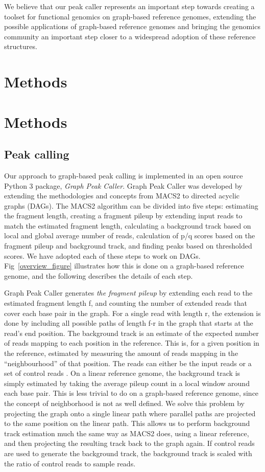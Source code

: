 \documentclass[10pt,letterpaper]{article}
\begin{document}
We believe that our peak caller represents an important step towards creating a toolset for functional genomics on graph-based reference genomes, extending the possible applications of graph-based reference genomes and bringing the genomics community an important step closer to a widespread adoption of these reference structures.

\section*{Methods}
\section*{Methods}
\subsection*{Peak calling}
Our approach to graph-based peak calling is implemented in an open source Python 3 package, \emph{Graph Peak Caller}. Graph Peak Caller was developed by extending the methodologies and concepts from MACS2 to directed acyclic graphs (DAGs). The MACS2 algorithm can be divided into five steps: estimating the fragment length, creating a fragment pileup by extending input reads to match the estimated fragment length, calculating a background track based on local and global average number of reads, calculation of p/q scores based on the fragment pileup and background track, and finding peaks based on thresholded scores. We have adopted each of these steps to work on DAGs. Fig~\ref{overview_figure} illustrates how this is done on a graph-based reference genome, and the following describes the details of each step.

Graph Peak Caller generates \emph{the fragment pileup} by extending each read to the estimated fragment length f, and counting the number of extended reads that cover each base pair in the graph. For a single read with length r, the extension is done by including all possible paths of length f-r in the graph that starts at the read’s end position. 
The background track is an estimate of the expected number of reads mapping to each position in the reference. This is, for a given position in the reference, estimated by measuring the amount of reads mapping in the “neighbourhood” of that position. The reads can either be the input reads or a set of control reads . On a linear reference genome, the background track is simply estimated by taking the average pileup count in a local window around each base pair. This is less trivial to do on a graph-based reference genome, since the concept of neighborhood is not as well defined. We solve this problem by projecting the graph onto a single linear path where parallel paths are projected to the same position on the linear path. This allows us to perform background track estimation much the same way as MACS2 does, using a linear reference, and then projecting the resulting track back to the graph again. If control reads are used to generate the background track, the background track is scaled with the ratio of control reads to sample reads.
	
\end{document}
